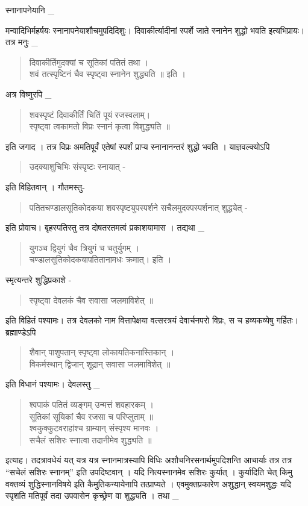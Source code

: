 स्नानापनेयानि \_

मन्वादिभिर्महर्षयः स्नानापनेयाशौचमुपदिदिशुः। दिवाकीर्त्यादीनां स्पर्शे जाते स्नानेन शुद्धो भवति इत्यभिप्रायः। तत्र मनुः _
\begin{verse}
दिवाकीर्तिमुदक्यां च सूतिकां पतितं तथा ।\\
शवं तत्स्पृष्टिनं चैव स्पृष्ट्वा स्नानेन शुद्ध्यति ॥ इति । 
\end{verse}
अत्र विष्णुरपि _
\begin{verse}
शवस्पृष्टं दिवाकीर्तिं चितिं पूयं रजस्वलाम्।\\
स्पृष्ट्वा त्वकामतो विप्रः स्नानं कृत्वा विशुद्ध्यति ॥ 
\end{verse}
इति जगाद । तत्र विप्रः अमतिपूर्वं एतेषां स्पर्शं प्राप्य स्नानानन्तरं शुद्धो भवति । याज्ञवल्क्योऽपि 
\begin{verse}
उदक्याशुचिभिः संस्पृष्टः स्नायात् -
\end{verse}
इति विहितवान् । गौतमस्तु- 
\begin{verse}
पतितचण्डालसूतिकोदकया शवस्पृष्ट्युपस्पर्शने सचैलमुदक्पस्पर्शनात्  शुद्ध्येत् -
\end{verse}
इति प्रोवाच। बृहस्पतिस्तु तत्र दोषतरतमत्वं प्रकाशयामास । तद्यथा _
\begin{verse}
युगञ्च द्वियुगं चैव त्रियुगं च चतुर्युगम् । \\
चण्डालसूतिकोदकयापतितानामधः क्रमात्। इति । 
\end{verse}
स्मृत्यन्तरे शुद्धिप्रकाशे - 
\begin{verse}
स्पृष्ट्वा देवलकं चैव सवासा जलमाविशेत् ॥
\end{verse}
इति विहितं पश्यामः। तत्र देवलको नाम वित्तापेक्षया वत्सरत्रयं देवार्चनपरो विप्रः, स च हव्यकव्येषु गर्हितः। ब्रह्माण्डेऽपि 
\begin{verse}
शैवान् पाशुपतान् स्पृष्ट्वा लोकायतिकनास्तिकान् ।\\
विकर्मस्थान् द्विजान् शूद्रान् सवासा जलमाविशेत्  ॥ 
\end{verse}
इति विधानं पश्यामः।  देवलस्तु _ 
\begin{verse}
श्वपाकं पतितं व्यङ्गम् उन्मत्तं शवहारकम् । \\
सूतिकां सूयिकां चैव रजसा च परिप्लुताम् ॥ \\
श्वकुक्कुटवराहांश्च ग्राम्यान् संस्पृश्य मानवः । \\
सचैलं सशिरः स्नात्वा तदानीमेव शुद्ध्यति ॥
\end{verse}
इत्याह। तदत्रावधेयं यत् यत्र यत्र स्नानमात्रस्यापि विधिः अशौचनिरसनार्थमुपदिशन्ति आचार्याः तत्र तत्र “सचेलं सशिरः स्नानम्” इति उपदिष्टवान् । यदि नित्यस्नानमेव सशिरः कुर्यात् । कुर्यादिति चेत् किमु वक्तव्यं शुद्धिस्नानविषये इति कैमुतिकन्यायेनापि तत्प्राप्यते । एवमुक्तप्रकारेण अशुद्धान् स्वयमशुद्धः यदि स्पृशति मतिपूर्वं तदा उपवासेन कृच्छ्रेण वा शुद्ध्यति । तथा _
